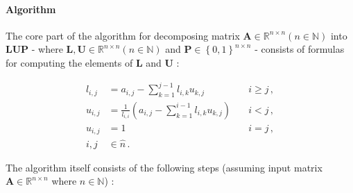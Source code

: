 \paragraph{Algorithm} The core part of the algorithm for decomposing matrix $\mathbf{A} \in \mathbb{R}^{n \times n} \left(n \in \mathbb{N}\right)$ into $\mathbf{LUP}$ - where $\mathbf{L}, \mathbf{U} \in \mathbb{R}^{n \times n} \left(n \in \mathbb{N}\right)$ and $\mathbf{P} \in \left\{0,1\right\}^{n \times n}$ - consists of formulas for computing the elements of $\mathbf{L}$ and $\mathbf{U}$ \cite{Press2007}:

\begin{align}
	l_{i,j} & = a_{i,j} - \sum_{k=1}^{j-1}l_{i,k}u_{k,j} 								    & \quad i \geq j\,, \label{Equation:theory->ICMPP->LUP->CMPP->lij} \\
	u_{i,j} & = \frac{1}{l_{i,i}} \left ( a_{i,j} - \sum_{k=1}^{i-1}l_{i,k}u_{k,j} \right ) & \quad i < j\,, 	\label{Equation:theory->ICMPP->LUP->CMPP->uij} \\
	u_{i,j} & = 1 																	  	    & \quad i = j \nonumber\,, 	\\
	i,j 	& \in \widehat{n} \nonumber\,.
\end{align}

The algorithm itself consists of the following steps (assuming input matrix $\mathbf{A} \in \mathbb{R}^{n \times n}$ where $n \in \mathbb{N}$) \cite{Press2007, Forsythe1960}:

